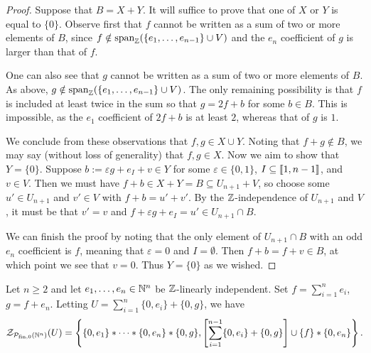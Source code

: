 \begin{proof}
Suppose that $B = X + Y$.
It will suffice to prove that one of $X$ or $Y$ is equal to $\{0\}$.
Observe first that $f$ cannot be written as a sum of two or more elements of $B$, since $f\notin \operatorname{span}_{\mathbb{Z}} (\{e_1,\dots, e_{n-1}\}\cup V)$ and the $e_n$ coefficient of $g$ is larger than that of $f$.

One can also see that $g$ cannot be written as a sum of two or more elements of $B$.
As above, $g\notin \operatorname{span}_{\mathbb{Z}} (\{e_1,\dots, e_{n-1}\}\cup V)$.
The only remaining possibility is that $f$ is included at least twice in the sum so that $g = 2f + b$ for some $b\in B$.
This is impossible, as the $e_1$ coefficient of $2f+b$ is at least $2$, whereas that of $g$ is $1$.

We conclude from these observations that $f,g\in X \cup Y$.
Noting that $f+g \notin B$, we may say (without loss of generality) that $f,g\in X$.
Now we aim to show that $Y = \{0\}$.
Suppose $b := \varepsilon g + e_I +v \in Y$ for some $\varepsilon \in \{0,1\}$, $I\subseteq \llbracket 1,n-1\rrbracket$, and $v\in V$.
Then we must have $f + b \in X+Y = B \subseteq U_{n+1} + V$, so choose some $u'\in U_{n+1}$ and $v'\in V$ with $f + b = u' + v'$.
By the $\mathbb{Z}$-independence of $U_{n+1}$ and $V$, it must be that $v' = v$ and $f + \varepsilon g + e_I = u' \in U_{n+1} \cap B$.

We can finish the proof by noting that the only element of $U_{n+1}\cap B$ with an odd $e_n$ coefficient is $f$, meaning that $\varepsilon=0$ and $I = \emptyset$.
Then $f+b = f+v \in B$, at which point we see that $v = 0$.
Thus $Y = \{0\}$ as we wished.
\end{proof}

\begin{thm} \label{thm:2n-length-set}
Let $n\ge 2$ and let $e_1,\dots, e_n\in \mathbb{N}^n$ be $\mathbb{Z}$-linearly independent.
Set $f = \sum_{i=1}^n e_i$, $g=f+e_n$.
Letting $U = \sum_{i=1}^n \{0,e_i\} + \{0,g\}$, we have 
\[\mathcal{Z}_{\mathcal{P}_{\textrm{fin}, 0}(\mathbb{N}^n)}(U) = \left\{ \{0,e_1\}*\cdots*\{0,e_n\}*\{0,g\}, \left[\sum_{i=1}^{n-1}\{0,e_i\}+\{0,g\}\right]\cup\{f\} * \{0,e_n\} \right\}. \]
\end{thm}

